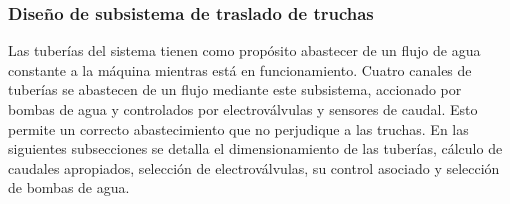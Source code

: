 

\subsubsection{Diseño de subsistema de traslado de truchas}

Las tuberías del sistema tienen como propósito abastecer de un flujo de agua constante a la máquina mientras está en funcionamiento. Cuatro canales de tuberías se abastecen de un flujo mediante este subsistema, accionado por bombas de agua y controlados por electroválvulas y sensores de caudal. Esto permite un correcto abastecimiento que no perjudique a las truchas. En las siguientes subsecciones se detalla el dimensionamiento de las tuberías, cálculo de caudales apropiados, selección de electroválvulas, su control asociado y selección de bombas de agua.

